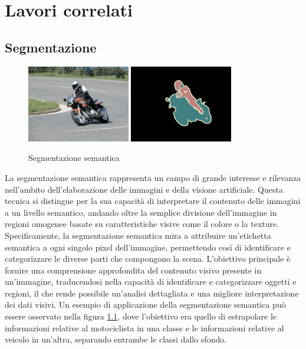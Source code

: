 \chapter{Lavori correlati} \label{chap:related_works}
\section{Segmentazione} \label{sec:segmentazione} 

\begin{figure}[!ht]
  \begin{center}
    \includegraphics[width=0.4\textwidth]{Immagini/segmantion_example_image.png}
    \includegraphics[width=0.4\textwidth]{Immagini/segmantion_example_mask.png}
  \end{center}
  \caption{Segmentazione semantica}
  \label{fig:segmentazione}
\end{figure}


La segmentazione semantica rappresenta un campo di grande interesse e rilevanza nell'ambito
dell'elaborazione delle immagini e della visione artificiale. Questa tecnica si distingue per la sua
capacità di interpretare il contenuto delle immagini a un livello semantico, andando oltre la
semplice divisione dell'immagine in regioni omogenee basate su caratteristiche visive come il colore
o la texture. Specificamente, la segmentazione semantica mira a attribuire un'etichetta semantica a
ogni singolo pixel dell'immagine, permettendo così di identificare e categorizzare le diverse parti
che compongono la scena. L'obiettivo principale è fornire una comprensione approfondita del
contenuto visivo presente in un'immagine, traducendosi nella capacità di identificare e
categorizzare oggetti e regioni, il che rende possibile un'analisi dettagliata e una migliore
interpretazione dei dati visivi. Un esempio di applicazione della segmentazione semantica può essere
osservato nella figura \ref{fig:segmentazione}, dove l'obiettivo era quello di estrapolare le
informazioni relative al motociclista in una classe e le informazioni relative al veicolo in
un'altra, separando entrambe le classi dallo sfondo.




